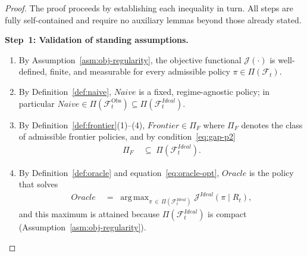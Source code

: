 \documentclass[12pt,openany]{book}
\numberwithin{equation}{chapter}
\theoremstyle{plain}
\theoremstyle{definition}
\theoremstyle{remark}
\numberwithin{equation}{chapter}
\theoremstyle{plain}
\DeclareMathOperator*{\argmax}{arg\,max}
\newcommand{\Ideal}{\mathcal{E}_{I}}
\newcommand{\Naive}{N}
\newcommand{\Oracle}{O}
\newcommand{\Frontier}{F}
\newcommand{\Obs}{\mathrm{Obs}}
\def\Naive{Naive}%
\def\Oracle{Oracle}%
\def\Ideal{Ideal}%
\def\Frontier{Frontier}%
\begin{document}
\begin{proof}
The proof proceeds by establishing each inequality in
turn.  All steps are fully self-contained and require no
auxiliary lemmas beyond those already stated.

\medskip
\noindent\textbf{Step~1: Validation of standing assumptions.}
\begin{enumerate}
  \item By Assumption~\ref{asm:obj-regularity}, the objective
        functional $\mathcal{J}(\cdot)$ is well-defined,
        finite, and measurable for every admissible policy
        $\pi \in \Pi(\mathcal{F}_t)$.
  \item By Definition~\ref{def:naive}, $\Naive$ is a fixed,
        regime-agnostic policy; in particular
        $\Naive \in \Pi(\mathcal{F}_t^{\Obs}) \subseteq
        \Pi(\mathcal{F}_t^{\Ideal})$.
  \item By Definition~\ref{def:frontier}(1)--(4),
        $\Frontier \in \Pi_F$ where $\Pi_F$ denotes the
        class of admissible frontier policies, and by
        condition~\eqref{eq:gap-p2}
        \begin{align}
          \Pi_F
          &\;\subseteq\;
          \Pi\!\left(\mathcal{F}_t^{\Ideal}\right).
          \label{eq:pf-subset}
        \end{align}
  \item By Definition~\ref{def:oracle} and
        equation~\eqref{eq:oracle-opt}, $\Oracle$ is the
        policy that solves
        \begin{align}
          \Oracle
          &\;=\;
          \argmax_{\pi\,\in\,\Pi(\mathcal{F}_t^{\Ideal})}
          \mathcal{J}^{\Ideal}(\pi \mid R_t),
          \label{eq:oracle-opt-restated}
        \end{align}
        and this maximum is attained because
        $\Pi(\mathcal{F}_t^{\Ideal})$ is compact
        (Assumption~\ref{asm:obj-regularity}).
\end{enumerate}


\end{proof}
\end{document}
